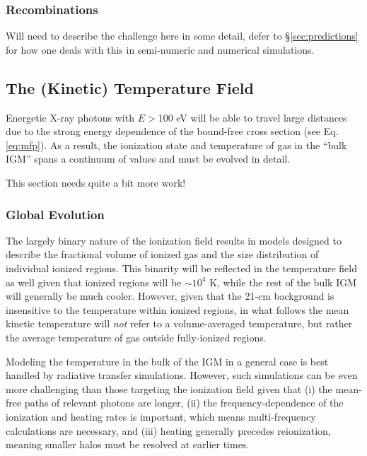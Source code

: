 \subsubsection{Recombinations}
{\color{red} Will need to describe the challenge here in some detail, defer to \S\ref{sec:predictions} for how one deals with this in semi-numeric and numerical simulations.}

% 


\subsection{The (Kinetic) Temperature Field}
Energetic X-ray photons with $E > 100$ eV will be able to travel large distances due to the strong energy dependence of the bound-free cross section (see Eq. \ref{eq:mfp}). As a result, the ionization state and temperature of gas in the ``bulk IGM'' spans a continuum of values and must be evolved in detail. 

{\color{red} This section needs quite a bit more work!}

\subsubsection{Global Evolution} \label{sec:temperature_global}
The largely binary nature of the ionization field results in models designed to describe the fractional volume of ionized gas and the size distribution of individual ionized regions. This binarity will be reflected in the temperature field as well given that ionized regions will be $\sim 10^4$ K, while the rest of the bulk IGM will generally be much cooler. However, given that the 21-cm background is insensitive to the temperature within ionized regions, in what follows the mean kinetic temperature will \textit{not} refer to a volume-averaged temperature, but rather the average temperature of gas outside fully-ionized regions. 

Modeling the temperature in the bulk of the IGM in a general case is best handled by radiative transfer simulations. However, such simulations can be even more challenging than those targeting the ionization field given that (i) the mean-free paths of relevant photons are longer, (ii) the frequency-dependence of the ionization and heating rates is important, which means multi-frequency calculations are necessary, and (iii) heating generally precedes reionization, meaning smaller halos must be resolved at earlier times. 

